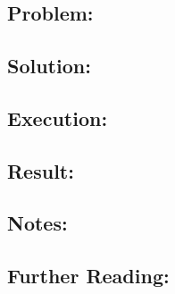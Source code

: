 \section{} %
\subsection{Problem:}

\subsection{Solution:}

\subsection{Execution:}

\subsection{Result:}

\subsection{Notes:}

\subsection{Further Reading:}
